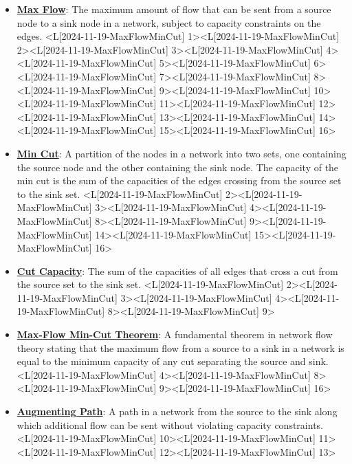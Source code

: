 \documentclass{article}%
\begin{document}
\begin{itemize}[[leftmargin=*]]%
\item \href{https://www.math.purdue.edu/~yipn/421/2024-11-19-MaxFlowMinCut.pdf#page=1}{\textbf{Max Flow}}: The maximum amount of flow that can be sent from a source node to a sink node in a network, subject to capacity constraints on the edges. <L[2024-11-19-MaxFlowMinCut] 1><L[2024-11-19-MaxFlowMinCut] 2><L[2024-11-19-MaxFlowMinCut] 3><L[2024-11-19-MaxFlowMinCut] 4><L[2024-11-19-MaxFlowMinCut] 5><L[2024-11-19-MaxFlowMinCut] 6><L[2024-11-19-MaxFlowMinCut] 7><L[2024-11-19-MaxFlowMinCut] 8><L[2024-11-19-MaxFlowMinCut] 9><L[2024-11-19-MaxFlowMinCut] 10><L[2024-11-19-MaxFlowMinCut] 11><L[2024-11-19-MaxFlowMinCut] 12><L[2024-11-19-MaxFlowMinCut] 13><L[2024-11-19-MaxFlowMinCut] 14><L[2024-11-19-MaxFlowMinCut] 15><L[2024-11-19-MaxFlowMinCut] 16>%
\item \href{https://www.math.purdue.edu/~yipn/421/2024-11-19-MaxFlowMinCut.pdf#page=2}{\textbf{Min Cut}}: A partition of the nodes in a network into two sets, one containing the source node and the other containing the sink node. The capacity of the min cut is the sum of the capacities of the edges crossing from the source set to the sink set. <L[2024-11-19-MaxFlowMinCut] 2><L[2024-11-19-MaxFlowMinCut] 3><L[2024-11-19-MaxFlowMinCut] 4><L[2024-11-19-MaxFlowMinCut] 8><L[2024-11-19-MaxFlowMinCut] 9><L[2024-11-19-MaxFlowMinCut] 14><L[2024-11-19-MaxFlowMinCut] 15><L[2024-11-19-MaxFlowMinCut] 16>%
\item \href{https://www.math.purdue.edu/~yipn/421/2024-11-19-MaxFlowMinCut.pdf#page=2}{\textbf{Cut Capacity}}: The sum of the capacities of all edges that cross a cut from the source set to the sink set. <L[2024-11-19-MaxFlowMinCut] 2><L[2024-11-19-MaxFlowMinCut] 3><L[2024-11-19-MaxFlowMinCut] 4><L[2024-11-19-MaxFlowMinCut] 8><L[2024-11-19-MaxFlowMinCut] 9>%
\item \href{https://www.math.purdue.edu/~yipn/421/2024-11-19-MaxFlowMinCut.pdf#page=4}{\textbf{Max{-}Flow Min{-}Cut Theorem}}: A fundamental theorem in network flow theory stating that the maximum flow from a source to a sink in a network is equal to the minimum capacity of any cut separating the source and sink. <L[2024-11-19-MaxFlowMinCut] 4><L[2024-11-19-MaxFlowMinCut] 8><L[2024-11-19-MaxFlowMinCut] 9><L[2024-11-19-MaxFlowMinCut] 16>%
\item \href{https://www.math.purdue.edu/~yipn/421/2024-11-19-MaxFlowMinCut.pdf#page=10}{\textbf{Augmenting Path}}: A path in a network from the source to the sink along which additional flow can be sent without violating capacity constraints. <L[2024-11-19-MaxFlowMinCut] 10><L[2024-11-19-MaxFlowMinCut] 11><L[2024-11-19-MaxFlowMinCut] 12><L[2024-11-19-MaxFlowMinCut] 13>%

\end{itemize}
\end{document}
